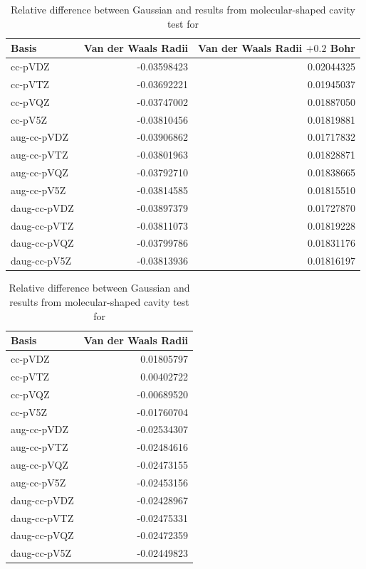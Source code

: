 \documentclass[../master_thesis.tex]{subfiles}
\begin{document}
\begin{table}[htbp]
\caption[Relative difference between Gaussian and \mrchem results for ]{Relative difference between Gaussian and \mrchem results from molecular-shaped cavity  test for }
\begin{tabular}{l|r|r}
Basis & \multicolumn{1}{l|}{Van der Waals Radii} & \multicolumn{1}{l|}{Van der Waals Radii $+ 0.2$ Bohr} \\ \hline
cc-pVDZ & -0.03598423 & 0.02044325 \\
cc-pVTZ & -0.03692221 & 0.01945037 \\
cc-pVQZ & -0.03747002 & 0.01887050 \\
cc-pV5Z & -0.03810456 & 0.01819881 \\
aug-cc-pVDZ & -0.03906862 & 0.01717832 \\
aug-cc-pVTZ & -0.03801963 & 0.01828871 \\
aug-cc-pVQZ & -0.03792710 & 0.01838665 \\
aug-cc-pV5Z & -0.03814585 & 0.01815510 \\
daug-cc-pVDZ & -0.03897379 & 0.01727870 \\
daug-cc-pVTZ & -0.03811073 & 0.01819228 \\
daug-cc-pVQZ & -0.03799786 & 0.01831176 \\
daug-cc-pV5Z & -0.03813936 & 0.01816197 \\
\end{tabular}
\label{tab:nopabcreldiff}
\end{table}


\begin{table}[!htbp]
\caption[Relative difference between Gaussian and \mrchem results for ]{Relative difference between Gaussian and \mrchem results from molecular-shaped cavity  test for }
\begin{tabular}{l|r}
Basis & \multicolumn{1}{l|}{Van der Waals Radii} \\ \hline
cc-pVDZ & 0.01805797 \\
cc-pVTZ & 0.00402722 \\
cc-pVQZ & -0.00689520 \\
cc-pV5Z & -0.01760704 \\
aug-cc-pVDZ & -0.02534307 \\
aug-cc-pVTZ & -0.02484616 \\
aug-cc-pVQZ & -0.02473155 \\
aug-cc-pV5Z & -0.02453156 \\
daug-cc-pVDZ & -0.02428967 \\
daug-cc-pVTZ & -0.02475331 \\
daug-cc-pVQZ & -0.02472359 \\
daug-cc-pV5Z & -0.02449823 \\
\end{tabular}
\label{tab:cyanabcreldiff}
\end{table}
\end{document}
